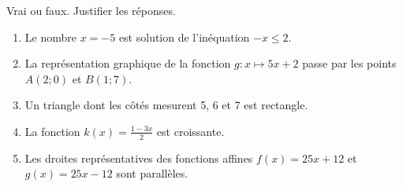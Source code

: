 
\begin{exercice}\label{exosmath-0522}

    Vrai ou faux. Justifier les réponses.
    \begin{enumerate}
        \item
            Le nombre \( x=-5\) est solution de l'inéquation \( -x\leq 2\).
        \item
            La représentation graphique de la fonction \( g\colon x\mapsto 5x+2\) passe par les points \( A(2;0)\) et \( B(1;7)\).
        \item
            Un triangle dont les côtés mesurent \unit{5}{\kilo\meter}, \unit{6}{\kilo\meter} et \unit{7}{\kilo\meter} est rectangle.
        \item
            La fonction \( k(x)=\frac{ 1-3x }{2}\) est croissante.
        \item
            Les droites représentatives des fonctions affines \( f(x)=25x+12\) et \( g(x)=25x-12\) sont parallèles.
    \end{enumerate}

\end{exercice}
